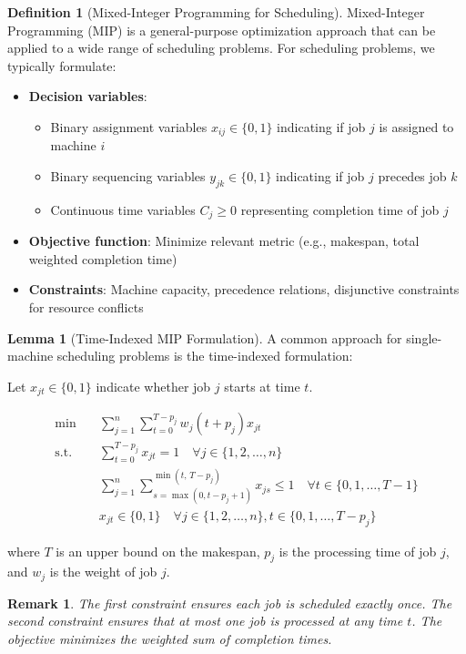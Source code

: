 \documentclass{article}
\newtheorem{remark}{Remark}
\theoremstyle{definition}
\newtheorem{lemma}{Lemma}
\newtheorem{definition}{Definition}
\begin{document}
\begin{definition}[Mixed-Integer Programming for Scheduling]
Mixed-Integer Programming (MIP) is a general-purpose optimization approach that can be applied to a wide range of scheduling problems. For scheduling problems, we typically formulate:
\begin{itemize}
    \item \textbf{Decision variables}: 
    \begin{itemize}
        \item Binary assignment variables $x_{ij} \in \{0, 1\}$ indicating if job $j$ is assigned to machine $i$
        \item Binary sequencing variables $y_{jk} \in \{0, 1\}$ indicating if job $j$ precedes job $k$
        \item Continuous time variables $C_j \geq 0$ representing completion time of job $j$
    \end{itemize}
    \item \textbf{Objective function}: Minimize relevant metric (e.g., makespan, total weighted completion time)
    \item \textbf{Constraints}: Machine capacity, precedence relations, disjunctive constraints for resource conflicts
\end{itemize}
\end{definition}

\begin{lemma}[Time-Indexed MIP Formulation]
A common approach for single-machine scheduling problems is the time-indexed formulation:

Let $x_{jt} \in \{0, 1\}$ indicate whether job $j$ starts at time $t$.

\begin{align}
\min \quad & \sum_{j=1}^{n} \sum_{t=0}^{T-p_j} w_j(t + p_j)x_{jt} \\
\text{s.t.} \quad & \sum_{t=0}^{T-p_j} x_{jt} = 1 \quad \forall j \in \{1, 2, \ldots, n\} \\
& \sum_{j=1}^{n} \sum_{s=\max(0, t-p_j+1)}^{\min(t,\, T-p_j)} x_{js} \leq 1 \quad \forall t \in \{0, 1, \ldots, T-1\} \\
& x_{jt} \in \{0, 1\} \quad \forall j \in \{1, 2, \ldots, n\}, t \in \{0, 1, \ldots, T-p_j\}
\end{align}

where $T$ is an upper bound on the makespan, $p_j$ is the processing time of job $j$, and $w_j$ is the weight of job $j$.

\begin{remark}
The first constraint ensures each job is scheduled exactly once. The second constraint ensures that at most one job is processed at any time $t$. The objective minimizes the weighted sum of completion times.
\end{remark}
\end{lemma}
\end{document}
